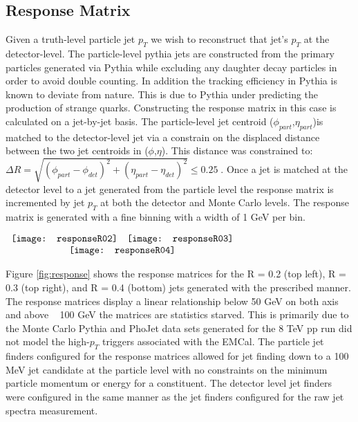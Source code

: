 \subsection{Response Matrix}
Given a truth-level particle jet $p_{T}$ we wish to reconstruct that jet's $p_{T}$ at the detector-level.  The particle-level pythia jets are constructed from the primary particles generated via Pythia while excluding any daughter decay particles in order to avoid double counting.  In addition the tracking efficiency in Pythia is known to deviate from nature.  This is due to Pythia under predicting the production of strange quarks.  
Constructing the response matrix in this case is calculated on a jet-by-jet basis.  The particle-level jet centroid ($\phi_{part}$,$\eta_{part}$)is matched to the detector-level jet via a constrain on the displaced distance between the two jet centroids in ($\phi$,$\eta$).  This distance was constrained to: $\Delta  R = \sqrt{(\phi_{part} - \phi_{det})^{2} + (\eta_{part} - \eta_{det})^{2}} \leq 0.25 \; $.  Once a jet is matched at the detector level to a jet generated from the particle level the response matrix is incremented by jet $p_{T}$ at both the detector and Monte Carlo levels.  The response matrix is generated with a fine binning with a width of 1 GeV per bin. 

\begin{figure*}[t!]
$\begin{array}{rl}
    \texttt{[image: responseR02]} &
    \texttt{[image: responseR03]}\\
    \multicolumn{2}{c}{\texttt{[image: responseR04]}}
\end{array}$
\caption[Response Matrices for R = 0.2, R=0.3, and R = 0.4 jets.]{\label{fig:response}Response Matrices for R = 0.2, R=0.3, and R = 0.4 jets.}
\end{figure*}

Figure \ref{fig:response} shows the response matrices for the R = 0.2 (top left), R = 0.3 (top right), and R = 0.4 (bottom) jets generated with the prescribed manner.  The response matrices display a linear relationship below 50 GeV on both axis and above ~ 100 GeV the matrices are statistics starved.  This is primarily due to the Monte Carlo Pythia and PhoJet data sets generated for the 8 TeV pp run did not model the high-$p_{T}$ triggers associated with the EMCal.  The particle jet finders configured for the response matrices allowed for jet finding down to a 100 MeV jet candidate at the particle level with no constraints on the minimum particle momentum or energy for a constituent.  The detector level jet finders were configured in the same manner as the jet finders configured for the raw jet spectra measurement.  

